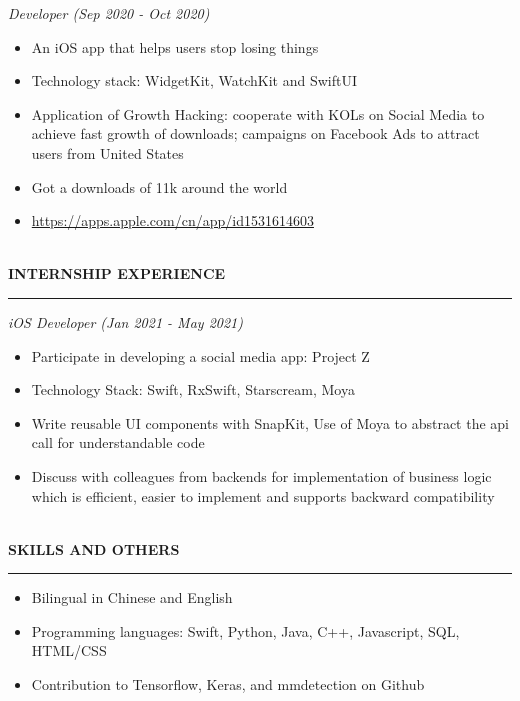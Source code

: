 \documentclass{article}
\begin{document}
\emph{Developer (Sep 2020 - Oct 2020)}
\begin{itemize}[leftmargin=*,topsep=0pt]
\item An iOS app that helps users stop losing things
\item Technology stack: WidgetKit, WatchKit and SwiftUI
\item Application of Growth Hacking: cooperate with KOLs on Social Media to achieve fast growth of downloads; campaigns on Facebook Ads to attract users from United States
\item Got a downloads of 11k around the world
\item \url{https://apps.apple.com/cn/app/id1531614603}

\end{itemize} \ \\ 
\noindent
{\textbf{INTERNSHIP EXPERIENCE}}\newline
\rule{\textwidth}{1pt}\newline
\emph{iOS Developer (Jan 2021 - May 2021)}
\begin{itemize}[leftmargin=*,topsep=0pt]
\item Participate in developing a social media app: Project Z
\item Technology Stack: Swift, RxSwift, Starscream, Moya
\item Write reusable UI components with SnapKit, Use of Moya to abstract the api call for understandable code
\item Discuss with colleagues from backends for implementation of business logic which is efficient, easier to implement and supports backward compatibility

\end{itemize} \ \\ 
\noindent
{\textbf{SKILLS AND OTHERS}}\newline
\rule{\textwidth}{1pt}\begin{itemize}[leftmargin=*,topsep=0pt]
\item Bilingual in Chinese and English
\item Programming languages: Swift, Python, Java, C++, Javascript, SQL, HTML/CSS
\item Contribution to Tensorflow, Keras, and mmdetection on Github

\end{itemize} \ \\ 
\end{document}
